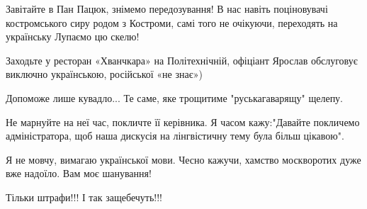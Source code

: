 \begin{itemize}
Завітайте в Пан Пацюк, знімемо передозування! В нас навіть поціновувачі
костромського сиру родом з Костроми, самі того не очікуючи, переходять на
українську \Smiley[1.0][yellow] Лупаємо цю скелю!


 

Заходьте у ресторан «Хванчкара» на Політехнічній, офіціант Ярослав обслуговує
виключно українською, російської «не знає»)

 
Допоможе лише кувадло... Те саме, яке трощитиме "руськагаварящу" щелепу.

 

Не марнуйте на неї час, покличте її керівника. Я часом кажу:"Давайте покличемо
адміністратора, щоб наша дискусія на лінгвістичну тему була більш цікавою".


 

Я не мовчу, вимагаю української мови. Чесно кажучи, хамство москворотих дуже
вже надоїло. Вам моє шанування!


 
Тільки штрафи!!! І так защебечуть!!!

 

\end{itemize}
